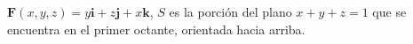 \item $\mathbf{F}(x, y, z) = y \mathbf{i} + z \mathbf{j} + x \mathbf{k}$, $S$ es la porción del plano $x + y + z = 1$ que se encuentra en el primer octante, orientada hacia arriba.
